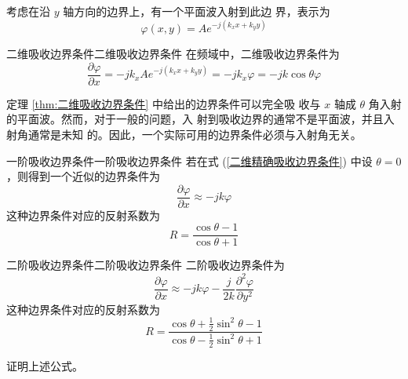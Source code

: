 \par 考虑在沿 $y$ 轴方向的边界上，有一个平面波入射到此边
界，表示为
\begin{equation}
    \varphi(x,y)=Ae^{-j(k_x x+k_y y)}
\end{equation}

\begin{theorem}{二维吸收边界条件}{二维吸收边界条件}
    在频域中，二维吸收边界条件为
    \begin{equation}
        \frac{\partial \varphi}{\partial x}
        =-jk_xAe^{-j(k_x x+k_y y)}
        =-jk_x\varphi
        =-jk\cos \theta \varphi
        \label{二维精确吸收边界条件}
    \end{equation}
\end{theorem}

\par 定理 \ref{thm:二维吸收边界条件} 中给出的边界条件可以完全吸
收与 $x$ 轴成 $\theta$ 角入射的平面波。然而，对于一般的问题，入
射到吸收边界的通常不是平面波，并且入射角通常是未知
的。因此，一个实际可用的边界条件必须与入射角无关。

\begin{theorem}{一阶吸收边界条件}{一阶吸收边界条件}
    若在式 (\ref{二维精确吸收边界条件}) 中设 $\theta=0$，则得到一个近似的边界条件为
    \begin{equation}
        \frac{\partial \varphi}{\partial x}
        \approx-jk\varphi
        \label{一阶频域吸收边界条件}
    \end{equation}
    这种边界条件对应的反射系数为
    \begin{equation}
        R=\frac{\cos \theta -1}{\cos \theta +1}
    \end{equation}
\end{theorem}

\begin{theorem}{二阶吸收边界条件}{二阶吸收边界条件}
    二阶吸收边界条件为
    \begin{equation}
        \frac{\partial \varphi}{\partial x}
        \approx-jk\varphi
        -\frac{j}{2k}\frac{\partial^2 \varphi}{\partial y^2}
        \label{二阶频域吸收边界条件}
    \end{equation}
    这种边界条件对应的反射系数为
    \begin{equation}
        R=\frac{\cos \theta +\frac{1}{2}\sin^2\theta-1}
        {\cos \theta -\frac{1}{2}\sin^2\theta+1}
    \end{equation}
\end{theorem}

\begin{exercise}
    证明上述公式。
\end{exercise}

